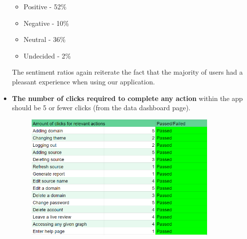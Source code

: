 \documentclass[12pt]{article}
\begin{document}
\begin{itemize}
    \begin{itemize}
        \item Positive - 52\%
        \item Negative - 10\%
        \item Neutral - 36\%
        \item Undecided - 2\%
    \end{itemize}
    The sentiment ratios again reiterate the fact that the majority of users had a pleasant experience when using our application.
        

    \item \textbf{The number of clicks required to complete any action} within the app should be 5 or fewer clicks (from the data dashboard page).
        \begin{figure}[H]
            \centering
            \includegraphics[width=0.9\textwidth]{table2.png}
        \end{figure}
\end{itemize}
\end{document}
